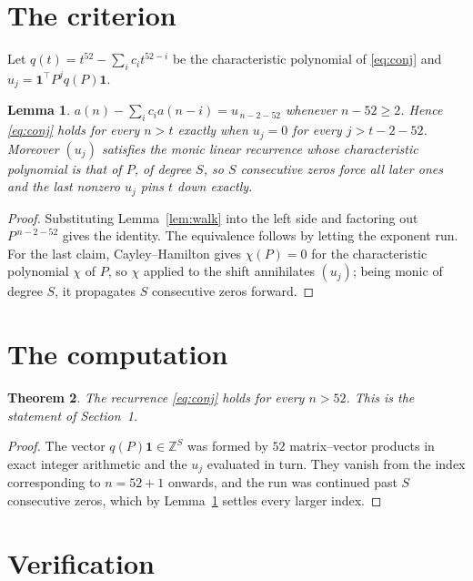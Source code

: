 \documentclass[11pt,a4paper]{article}
\theoremstyle{plain}
\newtheorem{theorem}{Theorem}
\newtheorem{lemma}[theorem]{Lemma}
\theoremstyle{definition}
\begin{document}
\section{The criterion}

Let $q(t)=t^{52}-\sum_i c_i t^{52-i}$ be the characteristic polynomial of
\eqref{eq:conj} and $u_j=\mathbf{1}^{\!\top}P^{j}q(P)\mathbf{1}$.

\begin{lemma}\label{lem:crit}
$a(n)-\sum_i c_i a(n-i)=u_{\,n-2-52}$ whenever $n-52\ge2$. Hence
\eqref{eq:conj} holds for every $n>t$ exactly when $u_j=0$ for every
$j>t-2-52$. Moreover $(u_j)$ satisfies the monic linear recurrence whose
characteristic polynomial is that of $P$, of degree $S$, so $S$ consecutive zeros force all
later ones and the last nonzero $u_j$ pins $t$ down exactly.
\end{lemma}

\begin{proof}
Substituting Lemma~\ref{lem:walk} into the left side and factoring out
$P^{\,n-2-52}$ gives the identity. The equivalence follows by letting the exponent
run. For the last claim, Cayley--Hamilton gives $\chi(P)=0$ for the characteristic
polynomial $\chi$ of $P$, so $\chi$ applied to the shift annihilates $(u_j)$; being monic of
degree $S$, it propagates $S$ consecutive zeros forward.
\end{proof}

\section{The computation}

\begin{theorem}
The recurrence \eqref{eq:conj} holds for every $n>52$. This is the statement of
Section~1.
\end{theorem}

\begin{proof}
The vector $q(P)\mathbf{1}\in\mathbb{Z}^{S}$ was formed by $52$ matrix--vector
products in exact integer arithmetic and the $u_j$ evaluated in turn. They vanish from the
index corresponding to $n=52+1$ onwards, and the run was continued past $S$ consecutive
zeros, which by Lemma~\ref{lem:crit} settles every larger index.
\end{proof}

\section{Verification}
\end{document}

